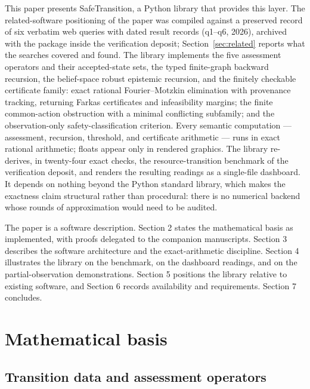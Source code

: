 \documentclass[3p,11pt]{elsarticle}
\begin{document}
This paper presents SafeTransition, a Python library that provides this
layer. The related-software positioning of the paper was compiled against a
preserved record of six verbatim web queries with dated result records
(q1--q6, 2026), archived with the package inside the verification deposit;
Section~\ref{sec:related} reports what the searches covered and found. The library implements the five assessment operators and their
accepted-state sets, the typed finite-graph backward recursion, the
belief-space robust epistemic recursion, and the finitely checkable
certificate family: exact rational Fourier--Motzkin elimination with
provenance tracking, returning Farkas certificates and infeasibility
margins; the finite common-action obstruction with a minimal conflicting
subfamily; and the observation-only safety-classification criterion. Every semantic computation --- assessment, recursion, threshold, and certificate arithmetic --- runs in
exact rational arithmetic; floats appear only in rendered graphics. The
library re-derives, in twenty-four exact checks, the resource-transition
benchmark of the verification deposit, and renders the resulting readings as
a single-file dashboard. It depends on nothing beyond the Python standard
library, which makes the exactness claim structural rather than procedural:
there is no numerical backend whose rounds of approximation would need to be
audited.

The paper is a software description. Section 2 states the mathematical basis
as implemented, with proofs delegated to the companion manuscripts.
Section 3 describes the software architecture and the exact-arithmetic
discipline. Section 4 illustrates the library on the benchmark, on the
dashboard readings, and on the partial-observation demonstrations. Section 5
positions the library relative to existing software, and Section 6 records
availability and requirements. Section 7 concludes.

\section{Mathematical basis}\label{sec:math}

\subsection{Transition data and assessment operators}\label{sec:operators}
\end{document}
